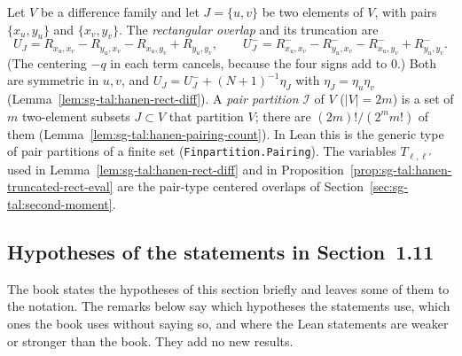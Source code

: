 \begin{definition}\label{def:sg-tal:hanen-rectangles}
\leanok
{}
Let $V$ be a difference family and let $J=\{u,v\}$ be two elements of $V$, with pairs $\{x_u,y_u\}$ and $\{x_v,y_v\}$.
The \emph{rectangular overlap} and its truncation are
\[
U_J=R_{x_u,x_v}-R_{y_u,x_v}-R_{x_u,y_v}+R_{y_u,y_v},\qquad
U_J^-=R^-_{x_u,x_v}-R^-_{y_u,x_v}-R^-_{x_u,y_v}+R^-_{y_u,y_v}.
\]
(The centering $-q$ in each term cancels, because the four signs add to $0$.) Both are symmetric in $u,v$, and
$U_J=U_J^-+(N+1)^{-1}\eta_J$ with $\eta_J=\eta_u\eta_v$ (Lemma~\ref{lem:sg-tal:hanen-rect-diff}).
A \emph{pair partition} $\mathcal I$ of $V$ ($|V|=2m$) is a set of $m$ two-element subsets $J\subset V$ that
partition $V$; there are $(2m)!/(2^mm!)$ of them (Lemma~\ref{lem:sg-tal:hanen-pairing-count}). In Lean this is the
generic type of pair partitions of a finite set (\texttt{Finpartition.Pairing}).
The variables $T_{\ell,\ell'}$ used in Lemma~\ref{lem:sg-tal:hanen-rect-diff} and in Proposition~\ref{prop:sg-tal:hanen-truncated-rect-eval}
are the pair-type centered overlaps of Section~\ref{sec:sg-tal:second-moment}.
\end{definition}

\subsection{Hypotheses of the statements in Section~1.11}\label{sec:sg-tal:hanen-hypotheses}

The book states the hypotheses of this section briefly and leaves some of them to the notation.
The remarks below say which hypotheses the statements use, which ones the book uses without saying so,
and where the Lean statements are weaker or stronger than the book. They add no new results.


